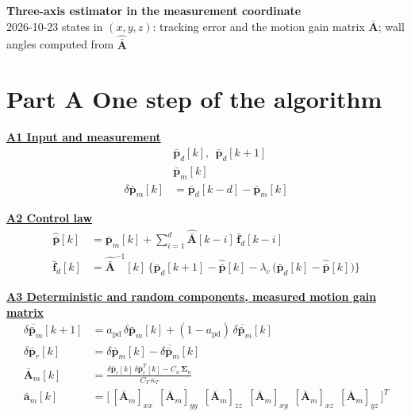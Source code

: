 \documentclass[11pt,a4paper]{ctexart}
\newcommand{\setline}[1]{\noindent{\small\textcolor[gray]{0.35}{#1}}\par\smallskip}
\newcommand{\hd}[1]{\par\bigskip\noindent\underline{\textbf{#1}}}
\newcommand{\lc}{\lambda_c}
\newcommand{\bp}{\bar{\mathbf p}}
\newcommand{\dpb}{\delta\bar{\mathbf p}}
\newcommand{\Ab}{\bar{\mathbf A}}
\newcommand{\Ah}{\hat{\bar{\mathbf A}}}
\newcommand{\av}{\bar{\mathbf a}}
\newcommand{\Sn}{\boldsymbol\Sigma_n}
\newcommand{\CK}{C_T\,\kappa_T}
\begin{document}
\begin{center}\textbf{\large Three-axis estimator in the measurement coordinate}\\[2pt]
\small 2026-10-23 \quad states in $(x, y, z)$: tracking error and the motion gain matrix $\Ab$; wall angles computed from $\Ah$\end{center}

\setline{Part A: one step of the algorithm (order of the notes). Part B: the key derivation steps. Q, R, $\mathbf P[0]$ and initial values are not written here.}

\part*{Part A \quad One step of the algorithm}

\hd{A1 \quad Input and measurement}
\begin{align*}
&\bp_d[k],\ \ \bp_d[k+1] \\
&\bp_m[k] \\
\dpb_m[k] &= \bp_d[k-d] - \bp_m[k]
\end{align*}

\hd{A2 \quad Control law}
\begin{align*}
\hat{\bp}[k] &= \bp_m[k] + \sum_{i=1}^{d} \Ah[k-i]\,\bar{\mathbf f}_d[k-i] \\
\bar{\mathbf f}_d[k] &= \Ah^{-1}[k]\,\Big\{\bp_d[k+1] - \hat{\bp}[k] - \lc\,\big(\bp_d[k] - \hat{\bp}[k]\big)\Big\}
\end{align*}

\hd{A3 \quad Deterministic and random components, measured motion gain matrix}
\begin{align*}
\overline{\dpb_m}[k+1] &= a_{\mathrm{pd}}\,\dpb_m[k] + (1 - a_{\mathrm{pd}})\,\overline{\dpb_m}[k] \\
\dpb_r[k] &= \dpb_m[k] - \overline{\dpb_m}[k] \\
\Ab_m[k] &= \frac{\dpb_r[k]\,\dpb_r^{T}[k] - C_n\,\Sn}{\CK} \\
\av_m[k] &= \big[\,[\Ab_m]_{xx}\ \ [\Ab_m]_{yy}\ \ [\Ab_m]_{zz}\ \ [\Ab_m]_{xy}\ \ [\Ab_m]_{xz}\ \ [\Ab_m]_{yz}\,\big]^{T}
\end{align*}
\end{document}

